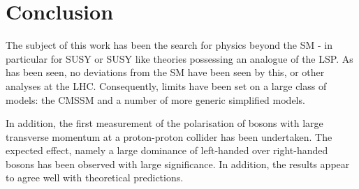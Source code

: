\chapter*{Conclusion}

The subject of this work has been the search for physics beyond the \ac{SM} - in
particular for \ac{SUSY} or \ac{SUSY} like theories possessing an analogue of
the \ac{LSP}. As has been seen, no deviations from the \ac{SM} have been seen by
this, or other analyses at the LHC. Consequently, limits have been set on a
large class of models: the \ac{CMSSM} and a number of more generic simplified
models.

In addition, the first measurement of the polarisation of \PW bosons with large
transverse momentum at a proton-proton collider has been undertaken. The
expected effect, namely a large dominance of left-handed over right-handed \PW
bosons has been observed with large significance. In addition, the results
appear to agree well with theoretical predictions.
